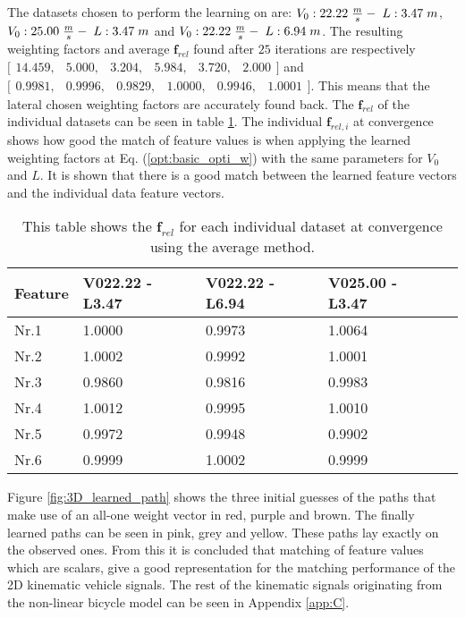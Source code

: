 The datasets chosen to perform the learning on are: $V_0:22.22\hspace{1mm}\frac{m}{s}-\hspace{1mm} L:3.47\hspace{1mm}m$, $V_0:25.00\hspace{1mm}\frac{m}{s}-\hspace{1mm} L:3.47\hspace{1mm}m$ and $V_0:22.22\hspace{1mm}\frac{m}{s}-\hspace{1mm} L:6.94\hspace{1mm}m$. The resulting weighting factors and average $\bm{f}_{rel}$ found after $25$ iterations are respectively $\bigl[ \begin{smallmatrix} 14.459,&5.000,&3.204,&5.984,&3.720,&2.000\end{smallmatrix}\bigr]$ and $\bigl[ \begin{smallmatrix} 0.9981,&0.9996,&0.9829,&1.0000,&0.9946,&1.0001\end{smallmatrix}\bigr]$. This means that the lateral chosen weighting factors are accurately found back. The $\bm{f}_{rel}$ of the individual datasets can be seen in table \ref{tab:in_av}.  The individual $\bm{f}_{rel,i}$ at convergence shows how good the match of feature values is when applying the learned weighting factors at Eq. (\ref{opt:basic_opti_w}) with the same parameters for $V_0$ and $L$. It is shown that there is a good match between the learned feature vectors and the individual data feature vectors.
 
\begin{table}[h!]
	\centering
	\begin{tabular}{@{}llllr@{}} \toprule
		\textbf{Feature}    & V022.22 - L3.47 & V022.22 - L6.94 & V025.00 - L3.47\\ \midrule
		Nr.1       		  &1.0000        & 0.9973 	    & 1.0064 		\\
		Nr.2              & 1.0002       & 0.9992       & 1.0001       \\
		Nr.3              & 0.9860       & 0.9816       & 0.9983       \\
		Nr.4              & 1.0012       & 0.9995       & 1.0010       \\
		Nr.5              & 0.9972       & 0.9948       & 0.9902       \\
		Nr.6              & 0.9999       & 1.0002       & 0.9999       \\ \bottomrule
	\end{tabular}
	\caption{This table shows the $\bm{f}_{rel}$ for each individual dataset at convergence using the average method.}
	\label{tab:in_av}
\end{table} 
Figure \ref{fig:3D_learned_path} shows the three initial guesses of the paths that make use of an all-one weight vector in red, purple and brown. The finally learned paths can be seen in pink, grey and yellow. These paths lay exactly on the observed ones. From this it is concluded that matching of feature values which are scalars, give a good representation for the matching performance of the 2D kinematic vehicle signals. The rest of the kinematic signals originating from the non-linear bicycle model can be seen in Appendix \ref{app:C}. 

